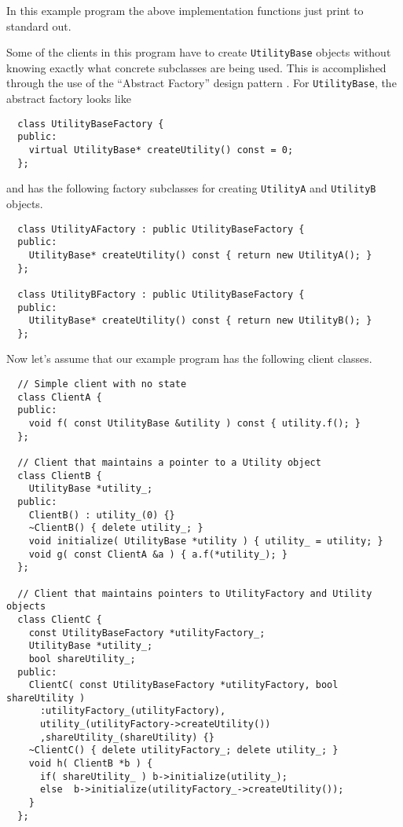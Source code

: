 \documentclass[pdf,ps2pdf,11pt]{SANDreport}
\begin{document}
{}\noindent{}In this example program the above implementation
functions just print to standard out.

Some of the clients in this program have to create
{}\texttt{Utility\-Base} objects without knowing exactly what concrete
subclasses are being used.  This is accomplished through the use of
the ``Abstract Factory'' design pattern {}\cite{ref:gama_et_al_1995}.
For {}\texttt{Utility\-Base}, the abstract factory looks like

{\small\begin{verbatim}
  class UtilityBaseFactory {
  public:
    virtual UtilityBase* createUtility() const = 0;
  };
\end{verbatim}}

{}\noindent{}and has the following factory subclasses for creating
{}\texttt{Utility\-A} and {}\texttt{Utility\-B} objects.

{\small\begin{verbatim}
  class UtilityAFactory : public UtilityBaseFactory {
  public:
    UtilityBase* createUtility() const { return new UtilityA(); }
  };
  
  class UtilityBFactory : public UtilityBaseFactory {
  public:
    UtilityBase* createUtility() const { return new UtilityB(); }
  };
\end{verbatim}}

Now let's assume that our example program has the following client
classes.

{\small\begin{verbatim}
  // Simple client with no state
  class ClientA {
  public:
    void f( const UtilityBase &utility ) const { utility.f(); }
  };
  
  // Client that maintains a pointer to a Utility object 
  class ClientB {
    UtilityBase *utility_;
  public:
    ClientB() : utility_(0) {}
    ~ClientB() { delete utility_; }
    void initialize( UtilityBase *utility ) { utility_ = utility; }
    void g( const ClientA &a ) { a.f(*utility_); }
  };
  
  // Client that maintains pointers to UtilityFactory and Utility objects
  class ClientC {
    const UtilityBaseFactory *utilityFactory_;
    UtilityBase *utility_;
    bool shareUtility_;
  public:
    ClientC( const UtilityBaseFactory *utilityFactory, bool shareUtility )
      :utilityFactory_(utilityFactory),
      utility_(utilityFactory->createUtility())
      ,shareUtility_(shareUtility) {}
    ~ClientC() { delete utilityFactory_; delete utility_; }
    void h( ClientB *b ) {
      if( shareUtility_ ) b->initialize(utility_);
      else  b->initialize(utilityFactory_->createUtility());
    }
  };
\end{verbatim}}
\end{document}
